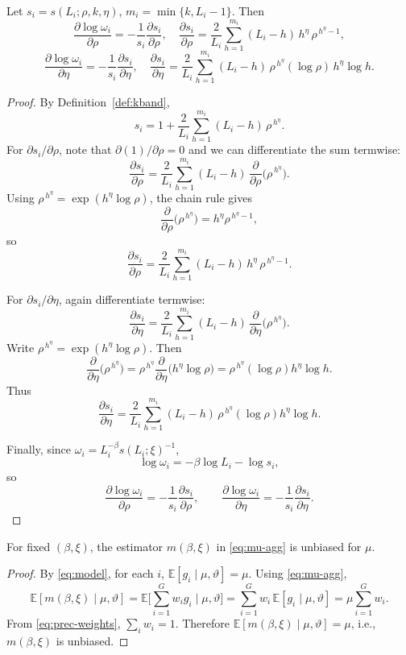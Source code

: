 \begin{lemma}
\label{lem:kband-deriv}
Let \(s_i=s(L_i;\rho,k,\eta)\), \(m_i=\min\{k,L_i-1\}\).
Then
\[
\frac{\partial \log \omega_i}{\partial \rho}
=-\frac{1}{s_i}\frac{\partial s_i}{\partial \rho},
\quad
\frac{\partial s_i}{\partial \rho}
=\frac{2}{L_i}\sum_{h=1}^{m_i} (L_i-h)\, h^{\eta}\, \rho^{\,h^{\eta}-1},
\]
\[
\frac{\partial \log \omega_i}{\partial \eta}
=-\frac{1}{s_i}\frac{\partial s_i}{\partial \eta},
\quad
\frac{\partial s_i}{\partial \eta}
=\frac{2}{L_i}\sum_{h=1}^{m_i} (L_i-h)\, \rho^{\,h^{\eta}} (\log \rho)\, h^{\eta}\log h.
\]
\end{lemma}
\begin{proof}
By Definition~\ref{def:kband},
\[
s_i
=1+\frac{2}{L_i}\sum_{h=1}^{m_i} (L_i-h)\,\rho^{\,h^{\eta}}.
\]
For \(\partial s_i/\partial \rho\), note that \(\partial(1)/\partial\rho=0\) and
we can differentiate the sum termwise:
\[
\frac{\partial s_i}{\partial \rho}
=\frac{2}{L_i}\sum_{h=1}^{m_i} (L_i-h)\,\frac{\partial}{\partial\rho}\big(\rho^{\,h^{\eta}}\big).
\]
Using \(\rho^{\,h^{\eta}}=\exp(h^{\eta}\log\rho)\), the chain rule gives
\[
\frac{\partial}{\partial\rho}\big(\rho^{\,h^{\eta}}\big)
=h^{\eta} \rho^{\,h^{\eta}-1},
\]
so
\[
\frac{\partial s_i}{\partial \rho}
=\frac{2}{L_i}\sum_{h=1}^{m_i} (L_i-h)\,h^{\eta}\,\rho^{\,h^{\eta}-1}.
\]

For \(\partial s_i/\partial \eta\), again differentiate termwise:
\[
\frac{\partial s_i}{\partial \eta}
=\frac{2}{L_i}\sum_{h=1}^{m_i} (L_i-h)\,\frac{\partial}{\partial\eta}\big(\rho^{\,h^{\eta}}\big).
\]
Write \(\rho^{\,h^{\eta}}=\exp(h^{\eta}\log\rho)\).
Then
\[
\frac{\partial}{\partial\eta}\big(\rho^{\,h^{\eta}}\big)
=\rho^{\,h^{\eta}}\frac{\partial}{\partial\eta}\big(h^{\eta}\log\rho\big)
=\rho^{\,h^{\eta}}(\log\rho)h^{\eta}\log h.
\]
Thus
\[
\frac{\partial s_i}{\partial \eta}
=\frac{2}{L_i}\sum_{h=1}^{m_i} (L_i-h)\,\rho^{\,h^{\eta}}(\log\rho)h^{\eta}\log h.
\]

Finally, since \(\omega_i=L_i^{-\beta}s(L_i;\xi)^{-1}\),
\[
\log\omega_i
=-\beta\log L_i-\log s_i,
\]
so
\[
\frac{\partial \log \omega_i}{\partial\rho}
=-\frac{1}{s_i}\frac{\partial s_i}{\partial\rho},
\qquad
\frac{\partial \log \omega_i}{\partial\eta}
=-\frac{1}{s_i}\frac{\partial s_i}{\partial\eta}.
\]
\end{proof}

\begin{proposition}
\label{prop:unbiased}
For fixed \((\beta,\xi)\), the estimator \(m(\beta,\xi)\) in \eqref{eq:mu-agg} is unbiased for \(\mu\).
\end{proposition}
\begin{proof}
By \eqref{eq:model}, for each \(i\),
\(\mathbb E[g_i\mid\mu,\vartheta]=\mu\).
Using \eqref{eq:mu-agg},
\[
\mathbb E[m(\beta,\xi)\mid\mu,\vartheta]
=\mathbb E\Bigg[\sum_{i=1}^G w_i g_i\;\bigg|\;\mu,\vartheta\Bigg]
=\sum_{i=1}^G w_i\,\mathbb E[g_i\mid\mu,\vartheta]
=\mu\sum_{i=1}^G w_i.
\]
From \eqref{eq:prec-weights}, \(\sum_i w_i=1\).
Therefore \(\mathbb E[m(\beta,\xi)\mid\mu,\vartheta]=\mu\), i.e., \(m(\beta,\xi)\) is unbiased.
\end{proof}

